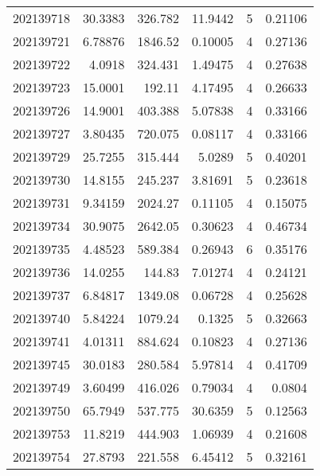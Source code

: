 \begin{tabular}{rrrrrr}
 202139718 &         30.3383  &      326.782  &           11.9442  &           5 & 0.21106 \\
 202139721 &          6.78876 &     1846.52   &            0.10005 &           4 & 0.27136 \\
 202139722 &          4.0918  &      324.431  &            1.49475 &           4 & 0.27638 \\
 202139723 &         15.0001  &      192.11   &            4.17495 &           4 & 0.26633 \\
 202139726 &         14.9001  &      403.388  &            5.07838 &           4 & 0.33166 \\
 202139727 &          3.80435 &      720.075  &            0.08117 &           4 & 0.33166 \\
 202139729 &         25.7255  &      315.444  &            5.0289  &           5 & 0.40201 \\
 202139730 &         14.8155  &      245.237  &            3.81691 &           5 & 0.23618 \\
 202139731 &          9.34159 &     2024.27   &            0.11105 &           4 & 0.15075 \\
 202139734 &         30.9075  &     2642.05   &            0.30623 &           4 & 0.46734 \\
 202139735 &          4.48523 &      589.384  &            0.26943 &           6 & 0.35176 \\
 202139736 &         14.0255  &      144.83   &            7.01274 &           4 & 0.24121 \\
 202139737 &          6.84817 &     1349.08   &            0.06728 &           4 & 0.25628 \\
 202139740 &          5.84224 &     1079.24   &            0.1325  &           5 & 0.32663 \\
 202139741 &          4.01311 &      884.624  &            0.10823 &           4 & 0.27136 \\
 202139745 &         30.0183  &      280.584  &            5.97814 &           4 & 0.41709 \\
 202139749 &          3.60499 &      416.026  &            0.79034 &           4 & 0.0804  \\
 202139750 &         65.7949  &      537.775  &           30.6359  &           5 & 0.12563 \\
 202139753 &         11.8219  &      444.903  &            1.06939 &           4 & 0.21608 \\
 202139754 &         27.8793  &      221.558  &            6.45412 &           5 & 0.32161 \\

\end{tabular}
